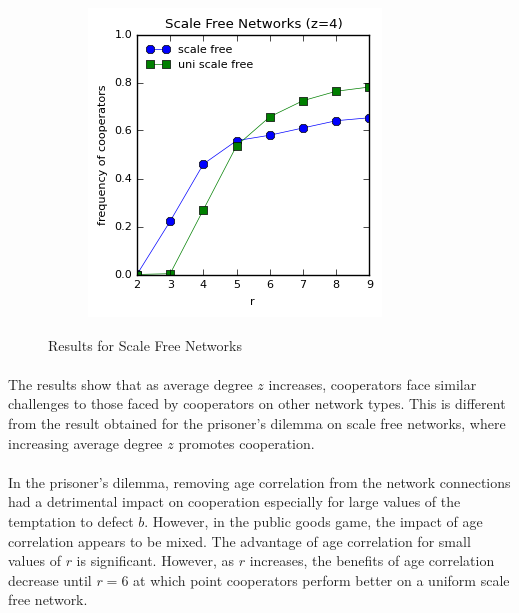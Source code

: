 \documentclass{article}
\begin{document}
\begin{figure}[h]
\begin{subfigure}[b]{0.4\textwidth}
			\caption{}
		\end{subfigure}
		\begin{subfigure}[b]{0.4\textwidth}
			\includegraphics[width=\textwidth]{fig/fixed/scalefreeall.png}
			\caption{}
		\end{subfigure}
		\caption{Results for Scale Free Networks}
		\label{fig:sfreenets}
	\end{figure}

	\paragraph{}The results show that as average degree $z$ increases, cooperators face similar challenges to those faced by cooperators on other network types.  This is different from the result obtained for the prisoner's dilemma on scale free networks, where increasing average degree $z$ promotes cooperation.

	\paragraph{}In the prisoner's dilemma, removing age correlation from the network connections had a detrimental impact on cooperation especially for large values of the temptation to defect $b$.  However, in the public goods game, the impact of age correlation appears to be mixed.  The advantage of age correlation for small values of $r$ is significant.  However, as $r$ increases, the benefits of age correlation decrease until $r=6$ at which point cooperators perform better on a uniform scale free network.
\end{document}
